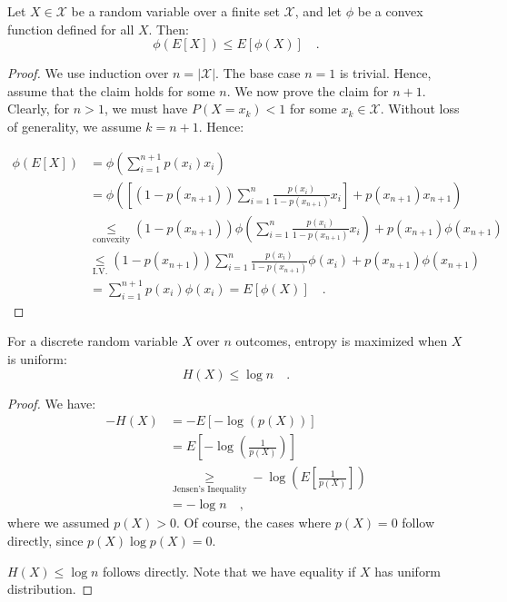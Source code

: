\documentclass[../../main.tex]{subfiles}
\begin{document}
\begin{lemma}
    Let $X \in \mathcal{X}$ be a random variable over a finite set $\mathcal{X}$, and let $\phi$ be a convex function defined for all $X$. Then:
    \[
        \phi(E[X]) \leq E[\phi(X)] \quad .
    \]
\end{lemma}
\begin{proof}
    We use induction over $n = |\mathcal{X}|$. The base case $n = 1$ is trivial. Hence, assume that the claim holds for some $n$. We now prove the claim for $n + 1$. Clearly, for $n > 1$, we must have $P(X = x_k) < 1$ for some $x_k \in \mathcal{X}$. Without loss of generality, we assume $k = n+1$. Hence:

    \begin{align*}
        \phi(E[X]) &= \phi \left( \sum_{i = 1}^{n+1} p(x_i) x_i \right) \\
        &= \phi \left( \left[ (1 - p(x_{n+1})) \sum_{i = 1}^{n} \frac{p(x_i)}{1 - p(x_{n+1})} x_i \right] + p(x_{n+1}) x_{n+1} \right) \\
        &\underset{\text{convexity}}{\leq} (1 - p(x_{n+1})) \phi \left( \sum_{i = 1}^{n} \frac{p(x_i)}{1 - p(x_{n+1})} x_i \right) + p(x_{n+1}) \phi(x_{n+1}) \\
        &\underset{\text{I.V.}}{\leq} (1 - p(x_{n+1})) \sum_{i = 1}^{n} \frac{p(x_i)}{1 - p(x_{n+1})} \phi(x_i) + p(x_{n+1}) \phi(x_{n+1}) \\
        &= \sum_{i = 1}^{n+1} p(x_i) \phi(x_i) = E[\phi(X)] \quad .
    \end{align*}
\end{proof}

\begin{proposition}
    For a discrete random variable \( X \) over \( n \) outcomes, entropy is maximized when \( X \) is uniform:
    \[
        H(X) \leq \log n \quad .
    \]
\end{proposition}
\begin{proof}
    We have:
    \begin{align*}
        -H(X) &= -E[-\log(p(X))] \\
        &= E \left[ -\log \left( \frac{1}{p(X)} \right)  \right] \\
        &\underset{\text{Jensen's Inequality}}{\geq} -\log \left( E \left[ \frac{1}{p(X)} \right] \right) \\
        &= -\log n \quad ,
    \end{align*}
    where we assumed $p(X) > 0$. Of course, the cases where $p(X) = 0$ follow directly, since $p(X) \log p(X) = 0$.
    
    $H(X) \leq \log n$ follows directly. Note that we have equality if $X$ has uniform distribution.
\end{proof}
\end{document}
